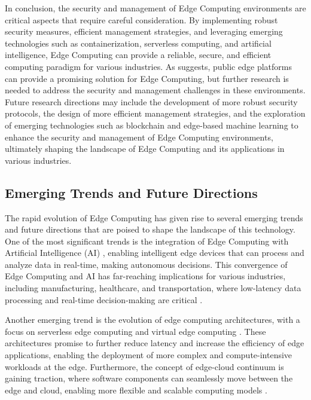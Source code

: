 \documentclass[11pt,a4paper]{article}
\begin{document}
In conclusion, the security and management of Edge Computing environments are critical aspects that require careful consideration. By implementing robust security measures, efficient management strategies, and leveraging emerging technologies such as containerization, serverless computing, and artificial intelligence, Edge Computing can provide a reliable, secure, and efficient computing paradigm for various industries. As \cite{arxiv:2109.03395} suggests, public edge platforms can provide a promising solution for Edge Computing, but further research is needed to address the security and management challenges in these environments. Future research directions may include the development of more robust security protocols, the design of more efficient management strategies, and the exploration of emerging technologies such as blockchain and edge-based machine learning to enhance the security and management of Edge Computing environments, ultimately shaping the landscape of Edge Computing and its applications in various industries.


\subsection{Emerging Trends and Future Directions}


The rapid evolution of Edge Computing has given rise to several emerging trends and future directions that are poised to shape the landscape of this technology. One of the most significant trends is the integration of Edge Computing with Artificial Intelligence (AI) \cite{arxiv:2003.12172}, enabling intelligent edge devices that can process and analyze data in real-time, making autonomous decisions. This convergence of Edge Computing and AI has far-reaching implications for various industries, including manufacturing, healthcare, and transportation, where low-latency data processing and real-time decision-making are critical \cite{arxiv:2112.01250}.

Another emerging trend is the evolution of edge computing architectures, with a focus on serverless edge computing and virtual edge computing \cite{arxiv:1702.06331}. These architectures promise to further reduce latency and increase the efficiency of edge applications, enabling the deployment of more complex and compute-intensive workloads at the edge. Furthermore, the concept of edge-cloud continuum is gaining traction, where software components can seamlessly move between the edge and cloud, enabling more flexible and scalable computing models \cite{arxiv:2309.05416}.
\end{document}
